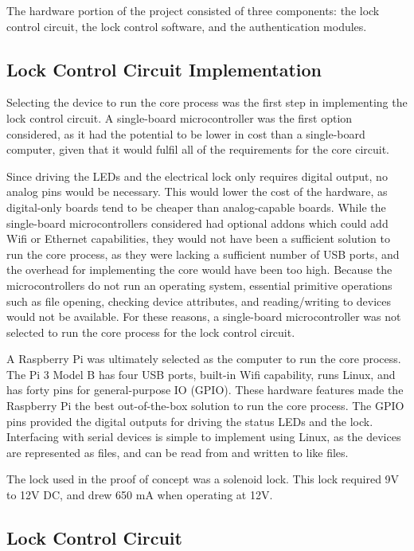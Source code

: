 \documentclass[12pt]{report}
\let\Oldsubsection\subsection
\renewcommand{\subsection}{\FloatBarrier\Oldsubsection}
\begin{document}
The hardware portion of the project consisted of three components: the lock control circuit, the lock control software, 
and the authentication modules.

\subsection{Lock Control Circuit Implementation} \label{section:lock-control-circuit-implementation}

Selecting the device to run the core process was the first step in implementing the lock control circuit. A 
single-board microcontroller was the first option considered, as it had the potential to be lower in cost than a 
single-board computer, given that it would fulfil all of the requirements for the core circuit.

Since driving the LEDs and the electrical lock only requires digital output, no analog pins would be necessary. This 
would lower the cost of the hardware, as digital-only boards tend to be cheaper than analog-capable boards. While 
the single-board microcontrollers considered had optional addons which could add Wifi or Ethernet capabilities, they 
would not have been a sufficient solution to run the core process, as they were lacking a sufficient number of USB 
ports, and the overhead for implementing the core would have been too high. Because the microcontrollers do not run an 
operating system, essential primitive operations such as file opening, checking device attributes, and reading/writing
to devices would not be available. For these reasons, a single-board microcontroller was not selected to run the core 
process for the lock control circuit.

A Raspberry Pi was ultimately selected as the computer to run the core process. The Pi 3 Model B has four USB ports, 
built-in Wifi capability, runs Linux, and has forty pins for general-purpose IO (GPIO). These hardware features made the
Raspberry Pi the best out-of-the-box solution to run the core process. The GPIO pins provided the digital outputs for 
driving the status LEDs and the lock. Interfacing with serial devices is simple to implement using Linux, as the devices 
are represented as files, and can be read from and written to like files.

The lock used in the proof of concept was a solenoid lock. This lock required 9V to 12V DC, and drew 650 mA when 
operating at 12V.

\subsection{Lock Control Circuit} \label{lock-control-circuit}
\end{document}
